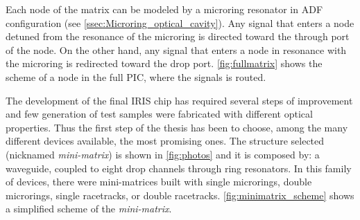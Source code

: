 Each node of the matrix can be modeled by a microring resonator in \acs{ADF} configuration (see \autoref{ssec:Microring_optical_cavity}).
Any signal that enters a node detuned from the resonance of the microring is directed toward the through port of the node.
On the other hand, any signal that enters a node in resonance with the microring is redirected toward the drop port.
\autoref{fig:fullmatrix} shows the scheme of a node in the full \acs{PIC}, where the signals is routed.


\newpage
The development of the final IRIS chip has required several steps of improvement and few generation of test samples were fabricated with different optical properties.
Thus the first step of the thesis has been to choose, among the many different devices available, the most promising ones.
The structure selected (nicknamed \textit{mini-matrix}) is shown in \autoref{fig:photos} and it is composed by: a waveguide, coupled to eight drop channels through ring resonators.
In this family of devices, there were mini-matrices built with single microrings, double microrings, single racetracks, or double racetracks.
\autoref{fig:minimatrix_scheme} shows a simplified scheme of the \textit{mini-matrix}.

